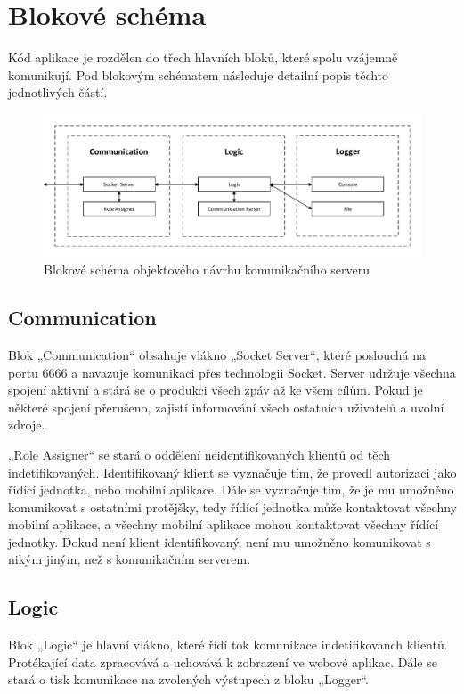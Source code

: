 \documentclass[FM,DP]{tulthesis}  %
\begin{document}
\section{Blokové schéma}
Kód aplikace je rozdělen do třech hlavních bloků, které spolu vzájemně komunikují. Pod blokovým schématem následuje detailní popis těchto jednotlivých částí.

\begin{figure}[H]
\begin{center}
\includegraphics[width=\textwidth]{vector/blokoveSchemaSecurityServer.pdf}
\caption{Blokové schéma objektového návrhu komunikačního serveru}
\label{image}
\end{center}
\end{figure}

\subsection{Communication}
Blok „Communication“ obsahuje vlákno „Socket Server“, které poslouchá na portu 6666 a navazuje komunikaci přes technologii Socket. Server udržuje všechna spojení aktivní a stárá se o produkci všech zpáv až ke všem cílům. Pokud je některé spojení přerušeno, zajistí informování všech ostatních uživatelů a uvolní zdroje. 

„Role Assigner“ se stará o oddělení neidentifikovaných klientů od těch indetifikovaných. Identifikovaný klient se vyznačuje tím, že provedl autorizaci jako řídící jednotka, nebo mobilní aplikace. Dále se vyznačuje tím, že je mu umožněno komunikovat s ostatními protějšky, tedy řídící jednotka může kontaktovat všechny mobilní aplikace, a všechny mobilní aplikace mohou kontaktovat všechny řídící jednotky. Dokud není klient identifikovaný, není mu umožněno komunikovat s nikým jiným, než s komunikačním serverem.

\subsection{Logic}
Blok „Logic“ je hlavní vlákno, které řídí tok komunikace indetifikovanch klientů. Protékající data zpracovává a uchovává k zobrazení ve webové aplikac. Dále se stará o tisk komunikace na zvolených výstupech z bloku „Logger“.
\end{document}
